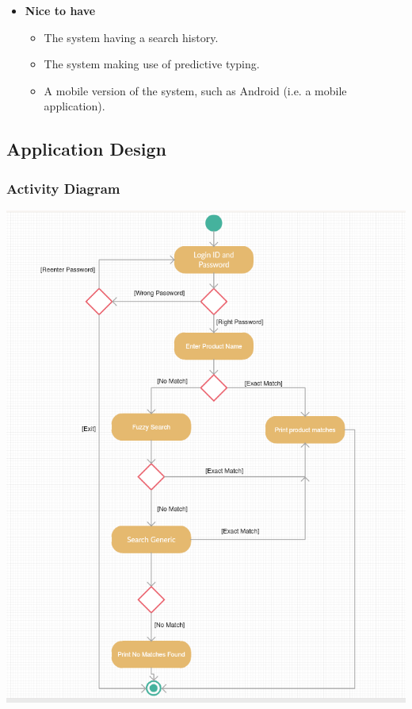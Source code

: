 \documentclass[a4paper,10pt]{article}
\begin{document}
\begin{enumerate}
\begin{itemize}
		\item \textbf{Nice to have}
		\begin{itemize}
		\item The system having a search history. 
		\item The system making use of predictive typing.
		\item A mobile version of the system, such as Android (i.e. a mobile application).
		\end{itemize}
\end{itemize}
		\end{enumerate} 
	
	\subsection{Application Design}
	\subsubsection {Activity Diagram}
		 \includegraphics[scale=0.62]{Diagrams/Activity Diagram.png}\\
		 
\end{document}
